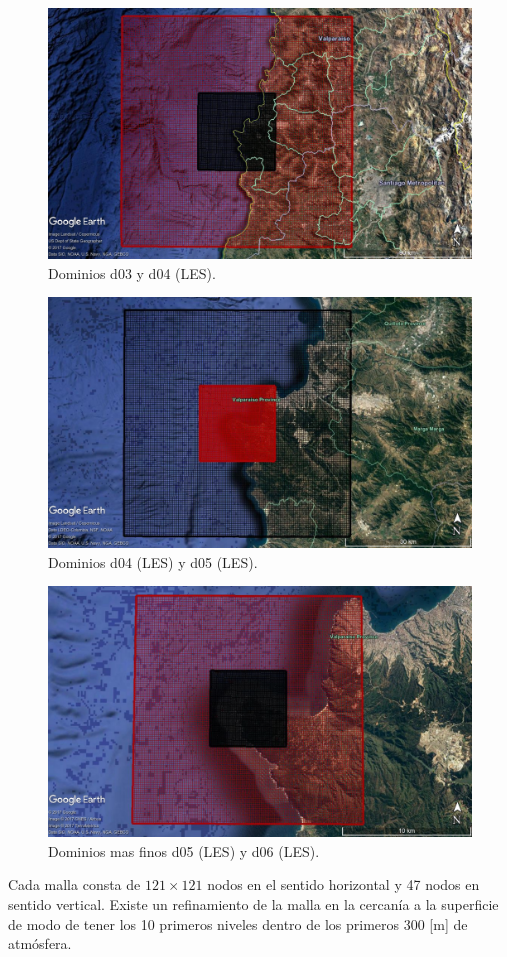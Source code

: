 \begin{figure}[H]
	\centering
	\includegraphics[width=0.95\linewidth]{Imagenes/d04d03}
	\caption{Dominios d03 y d04 (LES).}
	\label{fig:0304}
\end{figure}

\begin{figure}[H]
	\centering
	\includegraphics[width=0.95\linewidth]{Imagenes/d03d02}
	\caption{Dominios d04 (LES) y d05 (LES).}
	\label{fig:0405}
\end{figure}

\begin{figure}[H]
	\centering
	\includegraphics[width=0.95\linewidth]{Imagenes/d02d01}
	\caption{Dominios mas finos d05 (LES) y d06 (LES).}
	\label{fig:0506}
\end{figure}
Cada malla consta de $121\times 121$ nodos en el sentido horizontal y 47 nodos en sentido vertical. Existe un refinamiento de la malla en la cercanía a la superficie de modo de tener los 10 primeros niveles dentro de los primeros 300 [m] de atmósfera.
